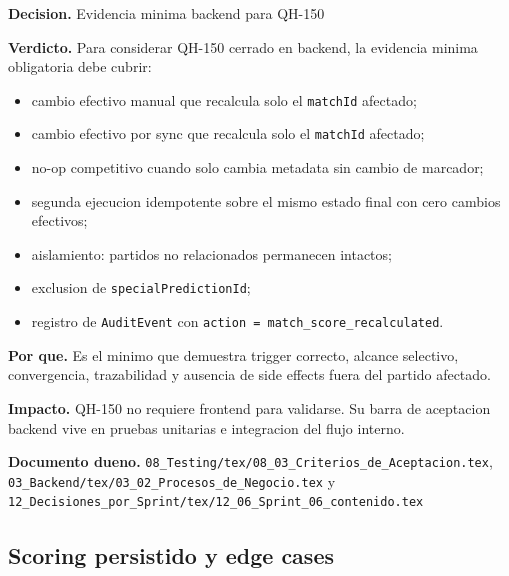 \begin{docnote}
\textbf{Decision.} Evidencia minima backend para QH-150

\textbf{Verdicto.} Para considerar QH-150 cerrado en backend, la evidencia minima obligatoria debe cubrir:
\begin{itemize}
  \item cambio efectivo manual que recalcula solo el \texttt{matchId} afectado;
  \item cambio efectivo por sync que recalcula solo el \texttt{matchId} afectado;
  \item no-op competitivo cuando solo cambia metadata sin cambio de marcador;
  \item segunda ejecucion idempotente sobre el mismo estado final con cero cambios efectivos;
  \item aislamiento: partidos no relacionados permanecen intactos;
  \item exclusion de \texttt{specialPredictionId};
  \item registro de \texttt{AuditEvent} con \texttt{action = match\_score\_recalculated}.
\end{itemize}

\textbf{Por que.} Es el minimo que demuestra trigger correcto, alcance selectivo, convergencia, trazabilidad y ausencia de side effects fuera del partido afectado.

\textbf{Impacto.} QH-150 no requiere frontend para validarse. Su barra de aceptacion backend vive en pruebas unitarias e integracion del flujo interno.

\textbf{Documento dueno.} \texttt{08\_Testing/tex/08\_03\_Criterios\_de\_Aceptacion.tex}, \texttt{03\_Backend/tex/03\_02\_Procesos\_de\_Negocio.tex} y \texttt{12\_Decisiones\_por\_Sprint/tex/12\_06\_Sprint\_06\_contenido.tex}
\end{docnote}

\subsection{Scoring persistido y edge cases}

